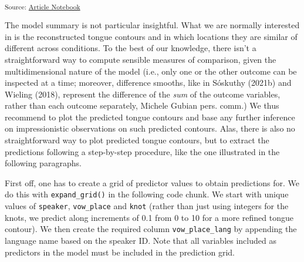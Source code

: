 \documentclass[
]{interact}
\begin{document}
\textsubscript{Source:
\href{https://stefanocoretta.github.io/mv_uti/index.qmd.html}{Article
Notebook}}

The model summary is not particular insightful. What we are normally
interested in is the reconstructed tongue contours and in which
locations they are similar of different across conditions. To the best
of our knowledge, there isn't a straightforward way to compute sensible
measures of comparison, given the multidimensional nature of the model
(i.e., only one or the other outcome can be inspected at a time;
moreover, difference smooths, like in Sóskuthy (2021b) and Wieling
(2018), represent the difference of the \emph{sum} of the outcome
variables, rather than each outcome separately, Michele Gubian pers.
comm.) We thus recommend to plot the predicted tongue contours and base
any further inference on impressionistic observations on such predicted
contours. Alas, there is also no straightforward way to plot predicted
tongue contours, but to extract the predictions following a step-by-step
procedure, like the one illustrated in the following paragraphs.

First off, one has to create a grid of predictor values to obtain
predictions for. We do this with \texttt{expand\_grid()} in the
following code chunk. We start with unique values of \texttt{speaker},
\texttt{vow\_place} and \texttt{knot} (rather than just using integers
for the knots, we predict along increments of 0.1 from 0 to 10 for a
more refined tongue contour). We then create the required column
\texttt{vow\_place\_lang} by appending the language name based on the
speaker ID. Note that all variables included as predictors in the model
must be included in the prediction grid.
\end{document}
